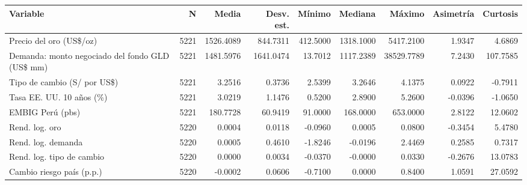 \begin{tabular}{lrrrrrrrr}
\toprule
Variable & N & Media & Desv. est. & Mínimo & Mediana & Máximo & Asimetría & Curtosis \\
\midrule
Precio del oro (US\$/oz) & 5221 & 1526.4089 & 844.7311 & 412.5000 & 1318.1000 & 5417.2100 & 1.9347 & 4.6869 \\
Demanda: monto negociado del fondo GLD (US\$ mm) & 5221 & 1481.5976 & 1641.0474 & 13.7012 & 1117.2389 & 38529.7789 & 7.2430 & 107.7585 \\
Tipo de cambio (S/ por US\$) & 5221 & 3.2516 & 0.3736 & 2.5399 & 3.2646 & 4.1375 & 0.0922 & -0.7911 \\
Tasa EE. UU. 10 años (\%) & 5221 & 3.0219 & 1.1476 & 0.5200 & 2.8900 & 5.2600 & -0.0396 & -1.0650 \\
EMBIG Perú (pbs) & 5221 & 180.7728 & 60.9419 & 91.0000 & 168.0000 & 653.0000 & 2.8122 & 12.0602 \\
Rend. log. oro & 5220 & 0.0004 & 0.0118 & -0.0960 & 0.0005 & 0.0800 & -0.3454 & 5.4780 \\
Rend. log. demanda & 5220 & 0.0005 & 0.4610 & -1.8246 & -0.0196 & 2.4469 & 0.2585 & 0.7317 \\
Rend. log. tipo de cambio & 5220 & 0.0000 & 0.0034 & -0.0370 & -0.0000 & 0.0330 & -0.2676 & 13.0783 \\
Cambio riesgo país (p.p.) & 5220 & -0.0002 & 0.0606 & -0.7100 & 0.0000 & 0.8400 & 1.0591 & 27.0592 \\
\bottomrule
\end{tabular}
